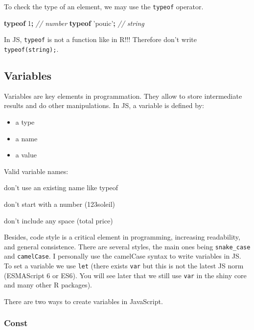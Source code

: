 \documentclass[]{book}
\newenvironment{Shaded}{\begin{snugshade}}{\end{snugshade}}
\newcommand{\CommentTok}[1]{\textcolor[rgb]{0.56,0.35,0.01}{\textit{#1}}}
\newcommand{\DecValTok}[1]{\textcolor[rgb]{0.00,0.00,0.81}{#1}}
\newcommand{\KeywordTok}[1]{\textcolor[rgb]{0.13,0.29,0.53}{\textbf{#1}}}
\newcommand{\OperatorTok}[1]{\textcolor[rgb]{0.81,0.36,0.00}{\textbf{#1}}}
\newcommand{\StringTok}[1]{\textcolor[rgb]{0.31,0.60,0.02}{#1}}
\providecommand{\tightlist}{%
  \setlength{\itemsep}{0pt}\setlength{\parskip}{0pt}}
\begin{document}
To check the type of an element, we may use the \texttt{typeof} operator.

\begin{Shaded}
\begin{Highlighting}[]
\KeywordTok{typeof} \DecValTok{1}\OperatorTok{;} \CommentTok{// number}
\KeywordTok{typeof} \StringTok{'pouic'}\OperatorTok{;} \CommentTok{// string}
\end{Highlighting}
\end{Shaded}

In JS, \texttt{typeof} is not a function like in R!!! Therefore don't write \texttt{typeof(\textquotesingle{}string\textquotesingle{});}.

\hypertarget{variables}{%
\subsection{Variables}\label{variables}}

Variables are key elements in programmation. They allow to store intermediate results and do other manipulations. In JS, a variable is defined by:

\begin{itemize}
\tightlist
\item
  a type
\item
  a name
\item
  a value
\end{itemize}

Valid variable names:

don't use an existing name like typeof

don't start with a number (123soleil)

don't include any space (total price)

Besides, code style is a critical element in programming, increasing readability, and general consistence. There are several styles, the main ones being \texttt{snake\_case} and \texttt{camelCase}. I personally use the camelCase syntax to write variables in JS. To set a variable we use \texttt{let} (there exists \texttt{var} but this is not the latest JS norm (ESMAScript 6 or ES6). You will see later that we still use \texttt{var} in the shiny core and many other R packages).

There are two ways to create variables in JavaScript.

\hypertarget{const}{%
\subsubsection{Const}\label{const}}
\end{document}
